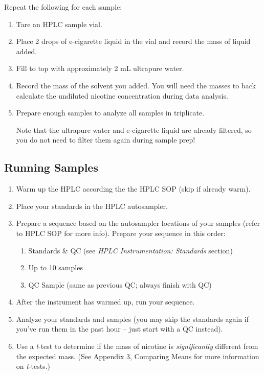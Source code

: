 \documentclass[]{tufte-book}
\providecommand{\tightlist}{%
  \setlength{\itemsep}{0pt}\setlength{\parskip}{0pt}}
\begin{document}
Repeat the following for each sample:

\begin{enumerate}
\def\labelenumi{\arabic{enumi}.}
\item
  Tare an HPLC sample vial.
\item
  Place 2 drops of e-cigarette liquid in the vial and record the mass of liquid added.
\item
  Fill to top with approximately 2 mL ultrapure water.
\item
  Record the mass of the solvent you added. You will need the masses to back calculate the undiluted nicotine concentration during data analysis.
\item
  Prepare enough samples to analyze all samples in triplicate.

  \begin{marginfigure}
   Note that the ultrapure water and e-cigarette liquid are already
   filtered, so you do not need to filter them again during sample prep!
   \end{marginfigure}
\end{enumerate}

\hypertarget{running-samples-1}{%
\subsection{Running Samples}\label{running-samples-1}}

\begin{enumerate}
\def\labelenumi{\arabic{enumi}.}
\tightlist
\item
  Warm up the HPLC according the the HPLC SOP (skip if already warm).
\item
  Place your standards in the HPLC autosampler.
\item
  Prepare a sequence based on the autosampler locations of your samples (refer to HPLC SOP for more info). Prepare your sequence in this order:

  \begin{enumerate}
  \def\labelenumii{\arabic{enumii}.}
  \tightlist
  \item
    Standards \& QC (see \emph{HPLC \textbar{} Instrumentation: Standards} section)
  \item
    Up to 10 samples
  \item
    QC Sample (same as previous QC; always finish with QC)
  \end{enumerate}
\item
  After the instrument has warmed up, run your sequence.
\item
  Analyze your standards and samples (you may skip the standards again if you've run them in the past hour -- just start with a QC instead).
\item
  Use a \emph{t}-test to determine if the mass of nicotine is \emph{significantly} different from the expected mass. (See Appendix 3, Comparing Means for more information on \emph{t}-tests.)
\end{enumerate}
\end{document}
